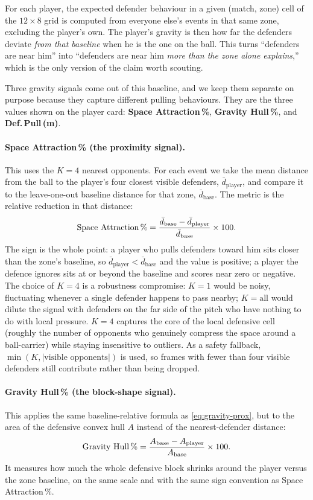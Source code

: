 \documentclass[12pt,a4paper]{article}
\begin{document}
For each player, the expected defender behaviour in a given (match, zone) cell of the $12\times8$ grid is computed from everyone else's events in that same zone, excluding the player's own.
The player's gravity is then how far the defenders deviate \emph{from that baseline} when he is the one on the ball.
This turns ``defenders are near him'' into ``defenders are near him \emph{more than the zone alone explains},'' which is the only version of the claim worth scouting.

Three gravity signals come out of this baseline, and we keep them separate on purpose because they capture different pulling behaviours. They are the three values shown on the player card: \textbf{Space Attraction\,\%}, \textbf{Gravity Hull\,\%}, and \textbf{Def.\,Pull\,(m)}.

\paragraph{Space Attraction\,\% (the proximity signal).}
This uses the $K = 4$ nearest opponents. For each event we take the mean distance from the ball to the player's four closest visible defenders, $\bar d_{\text{player}}$, and compare it to the leave-one-out baseline distance for that zone, $\bar d_{\text{base}}$. The metric is the relative reduction in that distance:
\begin{equation}\label{eq:gravity-prox}
    \text{Space Attraction\,\%} = \frac{\bar d_{\text{base}} - \bar d_{\text{player}}}{\bar d_{\text{base}}} \times 100.
\end{equation}
The sign is the whole point: a player who pulls defenders toward him sits closer than the zone's baseline, so $\bar d_{\text{player}} < \bar d_{\text{base}}$ and the value is positive; a player the defence ignores sits at or beyond the baseline and scores near zero or negative.
The choice of $K = 4$ is a robustness compromise: $K = 1$ would be noisy, fluctuating whenever a single defender happens to pass nearby; $K = \text{all}$ would dilute the signal with defenders on the far side of the pitch who have nothing to do with local pressure. $K = 4$ captures the core of the local defensive cell (roughly the number of opponents who genuinely compress the space around a ball-carrier) while staying insensitive to outliers. As a safety fallback, $\min(K, |\text{visible opponents}|)$ is used, so frames with fewer than four visible defenders still contribute rather than being dropped.

\paragraph{Gravity Hull\,\% (the block-shape signal).}
This applies the same baseline-relative formula as \cref{eq:gravity-prox}, but to the area of the defensive convex hull $A$ instead of the nearest-defender distance:
\begin{equation}\label{eq:gravity-hull}
    \text{Gravity Hull\,\%} = \frac{A_{\text{base}} - A_{\text{player}}}{A_{\text{base}}} \times 100.
\end{equation}
It measures how much the whole defensive block shrinks around the player versus the zone baseline, on the same scale and with the same sign convention as Space Attraction\,\%.
\end{document}
